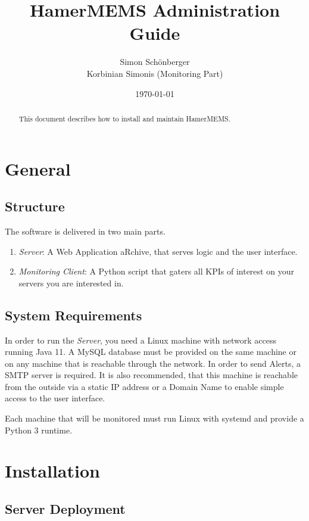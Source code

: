 \documentclass[twoside,a4paper]{refart}
\title{HamerMEMS Administration Guide}
\author{ Simon Sch\"onberger\\Korbinian Simonis (Monitoring Part)}
\date{\today}
\begin{document}
\maketitle

\begin{abstract}
  This document describes how to install and maintain HamerMEMS.
\end{abstract}


\tableofcontents

\newpage



\section{General}

\subsection{Structure}
The software is delivered in two main parts.
\begin{enumerate}
  \item \emph{Server}: A Web Application aRchive, that serves logic and the user interface.
  \item \emph{Monitoring Client}: A Python script that gaters all KPIs of interest on your servers you are interested in.
\end{enumerate}
\subsection{System Requirements}
In order to run the \emph{Server}, you need a Linux machine with network access running Java 11. A MySQL database must be provided on the same machine or on any machine that is reachable through the network. In order to send Alerts, a SMTP server is required. It is also recommended, that this machine is reachable from the outside via a static IP address or a Domain Name to enable simple access to the user interface.

Each machine that will be monitored must run Linux with systemd and provide a Python 3 runtime.



\section{Installation}
\subsection{Server Deployment}
\end{document}
